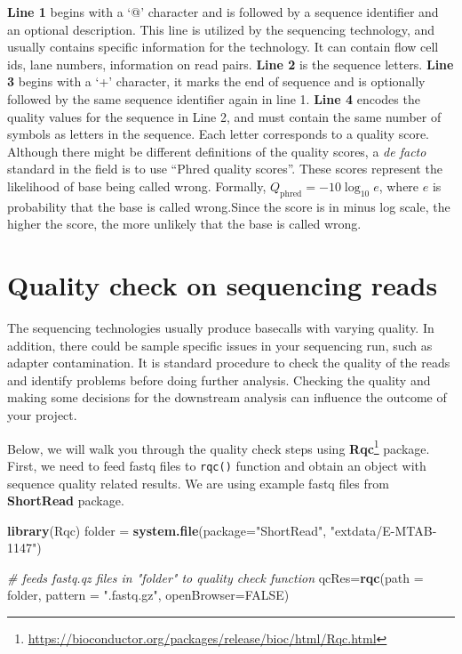 \documentclass[12pt,]{krantz}
\newenvironment{Shaded}{\begin{snugshade}}{\end{snugshade}}
\newcommand{\CommentTok}[1]{\textcolor[rgb]{0.56,0.35,0.01}{\textit{#1}}}
\newcommand{\DataTypeTok}[1]{\textcolor[rgb]{0.13,0.29,0.53}{#1}}
\newcommand{\KeywordTok}[1]{\textcolor[rgb]{0.13,0.29,0.53}{\textbf{#1}}}
\newcommand{\NormalTok}[1]{#1}
\newcommand{\OtherTok}[1]{\textcolor[rgb]{0.56,0.35,0.01}{#1}}
\newcommand{\StringTok}[1]{\textcolor[rgb]{0.31,0.60,0.02}{#1}}
\renewcommand{\href}[2]{#2\footnote{\url{#1}}}
\begin{document}
\textbf{Line 1} begins with a `@' character and is followed by a sequence identifier and an optional description. This line is utilized by the sequencing technology, and usually contains specific information for the technology. It can contain flow cell ids, lane numbers, information on read pairs. \textbf{Line 2} is the sequence letters. \textbf{Line 3} begins with a `+' character, it marks the end of sequence and is optionally followed by the same sequence identifier again in line 1. \textbf{Line 4} encodes the quality values for the sequence in Line 2, and must contain the same number of symbols as letters in the sequence. Each letter corresponds to a quality score. Although there might be different definitions of the quality scores, a \emph{de facto} standard in the field is to use ``Phred quality scores''. These scores represent the likelihood of base being called wrong. Formally, \({\displaystyle Q_{\text{phred}}=-10\log _{\text{10}}e}\), where \(e\) is probability that the base is called wrong.Since the score is in minus log scale, the higher the score, the more unlikely that the base is called wrong.

\hypertarget{quality-check-on-sequencing-reads}{%
\section{Quality check on sequencing reads}\label{quality-check-on-sequencing-reads}}

The sequencing technologies usually produce basecalls with varying quality. In addition, there could be sample specific issues in your sequencing run, such as adapter contamination. It is standard procedure to check the quality of the reads and identify problems before doing further analysis. Checking the quality and making some decisions for the downstream analysis can influence the outcome of your project.

Below, we will walk you through the quality check steps using \href{https://bioconductor.org/packages/release/bioc/html/Rqc.html}{\textbf{Rqc}} package. First, we need to feed fastq files to \texttt{rqc()} function and obtain an object with sequence quality related results. We are using example fastq files from \textbf{ShortRead} package.

\begin{Shaded}
\begin{Highlighting}[]
\KeywordTok{library}\NormalTok{(Rqc)}
\NormalTok{folder =}\StringTok{ }\KeywordTok{system.file}\NormalTok{(}\DataTypeTok{package=}\StringTok{"ShortRead"}\NormalTok{, }\StringTok{"extdata/E-MTAB-1147"}\NormalTok{)}

\CommentTok{# feeds fastq.qz files in "folder" to quality check function}
\NormalTok{qcRes=}\KeywordTok{rqc}\NormalTok{(}\DataTypeTok{path =}\NormalTok{ folder, }\DataTypeTok{pattern =} \StringTok{".fastq.gz"}\NormalTok{, }\DataTypeTok{openBrowser=}\OtherTok{FALSE}\NormalTok{)}
\end{Highlighting}
\end{Shaded}
\end{document}

